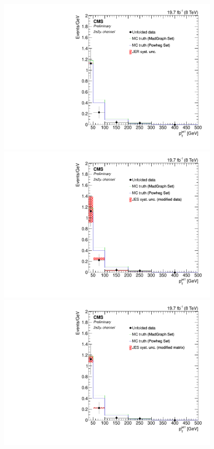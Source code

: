 \begin{figure}[hbtp]
\begin{center}
   \includegraphics[width=0.8\cmsFigWidth]{Figures/Unfolding/Systematics/ZZTo2e2m_PtJet1_JER_Mad_fr}
   \includegraphics[width=0.8\cmsFigWidth]{Figures/Unfolding/Systematics/ZZTo2e2m_PtJet1_JES_ModData_Mad_fr}     
   \includegraphics[width=0.8\cmsFigWidth]{Figures/Unfolding/Systematics/ZZTo2e2m_PtJet1_JES_ModMat_Mad_fr}

\end{center}
\end{figure}
